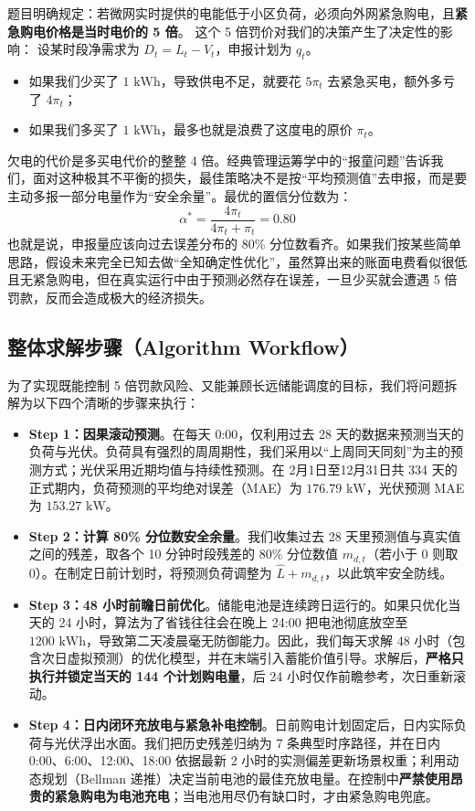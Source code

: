 \documentclass[withoutpreface]{cumcmthesis}
\begin{document}
题目明确规定：若微网实时提供的电能低于小区负荷，必须向外网紧急购电，且\textbf{紧急购电价格是当时电价的 5 倍}。
这个 5 倍罚价对我们的决策产生了决定性的影响：
设某时段净需求为 $D_t = L_t - V_t$，申报计划为 $q_t$。
\begin{itemize}
    \item 如果我们少买了 $1\text{ kWh}$，导致供电不足，就要花 $5\pi_t$ 去紧急买电，额外多亏了 $4\pi_t$；
    \item 如果我们多买了 $1\text{ kWh}$，最多也就是浪费了这度电的原价 $\pi_t$。
\end{itemize}
欠电的代价是多买电代价的整整 4 倍。经典管理运筹学中的“报童问题”告诉我们，面对这种极其不平衡的损失，最佳策略决不是按“平均预测值”去申报，而是要主动多报一部分电量作为“安全余量”。最优的置信分位数为：
\begin{equation}
    \alpha^* = \frac{4\pi_t}{4\pi_t + \pi_t} = 0.80
\end{equation}
也就是说，申报量应该向过去误差分布的 80\% 分位数看齐。如果我们按某些简单思路，假设未来完全已知去做“全知确定性优化”，虽然算出来的账面电费看似很低且无紧急购电，但在真实运行中由于预测必然存在误差，一旦少买就会遭遇 5 倍罚款，反而会造成极大的经济损失。

\subsection{整体求解步骤（Algorithm Workflow）}
为了实现既能控制 5 倍罚款风险、又能兼顾长远储能调度的目标，我们将问题拆解为以下四个清晰的步骤来执行：

\begin{itemize}
    \item \textbf{Step 1：因果滚动预测}。在每天 0:00，仅利用过去 28 天的数据来预测当天的负荷与光伏。负荷具有强烈的周周期性，我们采用以“上周同天同刻”为主的预测方式；光伏采用近期均值与持续性预测。在 2月1日至12月31日共 334 天的正式期内，负荷预测的平均绝对误差（MAE）为 $176.79\text{ kW}$，光伏预测 MAE 为 $153.27\text{ kW}$。
    
    \item \textbf{Step 2：计算 80\% 分位数安全余量}。我们收集过去 28 天里预测值与真实值之间的残差，取各个 10 分钟时段残差的 80\% 分位数值 $m_{d,t}$（若小于 0 则取 0）。在制定日前计划时，将预测负荷调整为 $\widehat{L} + m_{d,t}$，以此筑牢安全防线。
    
    \item \textbf{Step 3：48 小时前瞻日前优化}。储能电池是连续跨日运行的。如果只优化当天的 24 小时，算法为了省钱往往会在晚上 24:00 把电池彻底放空至 $1200\text{ kWh}$，导致第二天凌晨毫无防御能力。因此，我们每天求解 48 小时（包含次日虚拟预测）的优化模型，并在末端引入蓄能价值引导。求解后，\textbf{严格只执行并锁定当天的 144 个计划购电量}，后 24 小时仅作前瞻参考，次日重新滚动。
    
    \item \textbf{Step 4：日内闭环充放电与紧急补电控制}。日前购电计划固定后，日内实际负荷与光伏浮出水面。我们把历史残差归纳为 7 条典型时序路径，并在日内 0:00、6:00、12:00、18:00 依据最新 2 小时的实测偏差更新场景权重；利用动态规划（Bellman 递推）决定当前电池的最佳充放电量。在控制中\textbf{严禁使用昂贵的紧急购电为电池充电}；当电池用尽仍有缺口时，才由紧急购电兜底。
\end{itemize}
\end{document}
